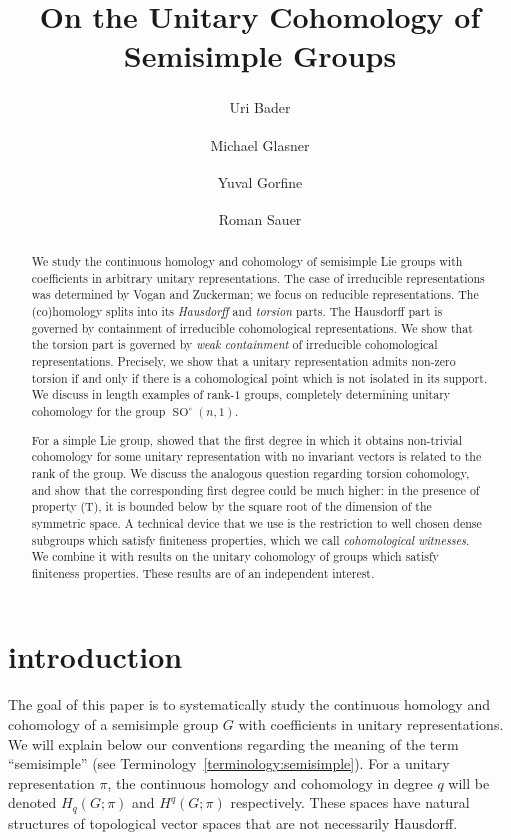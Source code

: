 \documentclass[12pt,reqno]{amsart}
\title{On the Unitary Cohomology of Semisimple Groups}
\author[U. Bader]{Uri Bader\textsuperscript{\earthsym}}
\author[M. Glasner]{Michael Glasner\textsuperscript{\watersym}}
\author[Y. Gorfine]{Yuval Gorfine\textsuperscript{\airsym}}
\author[R. Sauer]{Roman Sauer\textsuperscript{\firesym}}
\theoremstyle{definition}
\newcommand{\SO}{\operatorname{SO}}
\begin{document}
\begin{abstract}
We study the continuous homology and cohomology of semisimple Lie groups with coefficients in arbitrary unitary representations. The case of irreducible representations was determined by Vogan and Zuckerman; we focus on reducible representations. The (co)homology splits into its \emph{Hausdorff} and \emph{torsion} parts. The Hausdorff part is governed by containment of irreducible cohomological representations. We show that the torsion part is governed by \emph{weak containment} of irreducible cohomological representations. Precisely, we show that a unitary representation admits non-zero torsion if and only if there is a cohomological point which is not isolated in its support. We discuss in length examples of rank-$1$ groups, completely determining unitary cohomology for the group $\SO^\circ(n,1)$.

For a simple Lie group, \cite{BaderSauer} showed that the first degree in which it obtains non-trivial cohomology for some unitary representation with no invariant vectors is related to the rank of the group. We discuss the analogous question regarding torsion cohomology, and show that the corresponding first degree could be much higher: in the presence of property (T), it is bounded below by the square root of the dimension of the symmetric space. A technical device that we use  is the restriction to well chosen dense subgroups which satisfy finiteness properties, which we call \emph{cohomological witnesses}. We combine it with results on the unitary cohomology of groups which satisfy finiteness properties. These results are of an independent interest.
\end{abstract}

\maketitle

\section{introduction}\label{sec1}
The goal of this paper is to systematically study the continuous homology and cohomology of a semisimple group $G$ with coefficients in unitary representations. 
We will explain below our conventions regarding the meaning of the term ``semisimple'' (see Terminology~\ref{terminology:semisimple}).
For a unitary representation $\pi$, the continuous homology and cohomology in degree $q$ will be denoted $H_q(G; \pi)$ and $H^q(G;\pi)$ respectively.
These spaces have natural structures of topological vector spaces that are not necessarily Hausdorff.
\end{document}
